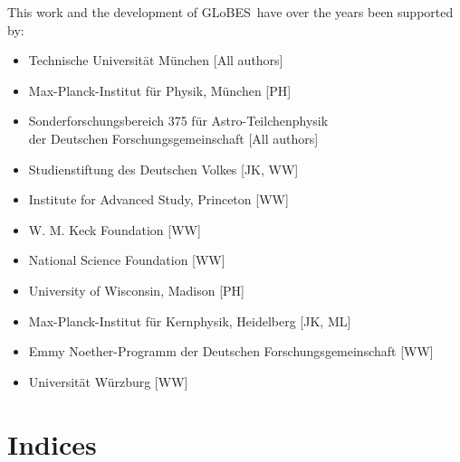 \documentclass[a4paper,12pt,twoside]{book}
\newcommand{\GLOBES}{{\sf GLoBES}}
\begin{document}
This work and the development of \GLOBES\ have over the years been supported by:
\begin{itemize}
\item Technische Universit\"at M\"unchen [All authors]
\item Max-Planck-Institut f\"ur Physik, M\"unchen [PH]
\item Sonderforschungsbereich 375 f\"ur Astro-Teilchenphysik\\
der Deutschen Forschungsgemeinschaft [All authors]
\item Studienstiftung des Deutschen Volkes [JK, WW]
\item Institute for Advanced Study, Princeton [WW]
\item W. M. Keck Foundation [WW]
\item National Science Foundation [WW]
\item University of Wisconsin, Madison [PH]
\item Max-Planck-Institut f\"ur Kernphysik, Heidelberg [JK, ML]
\item Emmy Noether-Programm der Deutschen Forschungsgemeinschaft [WW]
\item Universit\"at W\"urzburg [WW]
\end{itemize}










\chapter{Indices}



\end{document}
